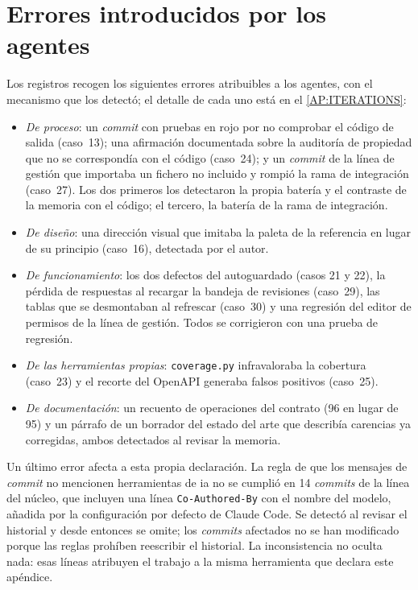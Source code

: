 \section*{Errores introducidos por los agentes}

Los registros recogen los siguientes errores atribuibles a los agentes, con el mecanismo que
los detectó; el detalle de cada uno está en el \cref{AP:ITERATIONS}:
\begin{itemize}
  \item \emph{De proceso}: un \textit{commit} con pruebas en rojo por no comprobar el código
        de salida (caso~13); una afirmación documentada sobre la auditoría de propiedad que
        no se correspondía con el código (caso~24); y un \textit{commit} de la línea de
        gestión que importaba un fichero no incluido y rompió la rama de integración
        (caso~27). Los dos primeros los detectaron la propia batería y el contraste de la
        memoria con el código; el tercero, la batería de la rama de integración.
  \item \emph{De diseño}: una dirección visual que imitaba la paleta de la referencia en
        lugar de su principio (caso~16), detectada por el autor.
  \item \emph{De funcionamiento}: los dos defectos del autoguardado (casos 21 y 22), la
        pérdida de respuestas al recargar la bandeja de revisiones (caso~29), las tablas
        que se desmontaban al refrescar (caso~30) y una regresión del editor de permisos de
        la línea de gestión. Todos se corrigieron con una prueba de regresión.
  \item \emph{De las herramientas propias}: \texttt{coverage.py} infravaloraba la cobertura
        (caso~23) y el recorte del OpenAPI generaba falsos positivos (caso~25).
  \item \emph{De documentación}: un recuento de operaciones del contrato (96 en lugar de
        95) y un párrafo de un borrador del estado del arte que describía carencias ya
        corregidas, ambos detectados al revisar la memoria.
\end{itemize}

Un último error afecta a esta propia declaración. La regla de que los mensajes de
\textit{commit} no mencionen herramientas de \acs{ia} no se cumplió en 14
\textit{commits} de la línea del núcleo, que incluyen una línea
\texttt{Co-Authored-By} con el nombre del modelo, añadida por la configuración por defecto
de Claude Code. Se detectó al revisar el historial y desde entonces se omite; los
\textit{commits} afectados no se han modificado porque las reglas prohíben reescribir el
historial. La inconsistencia no oculta nada: esas líneas atribuyen el trabajo a la misma
herramienta que declara este apéndice.

